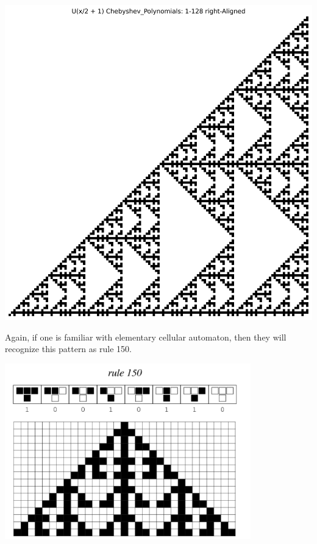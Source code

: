 \documentclass{article}
\begin{document}
	\begin{center}
		\includegraphics[width=.8\textwidth]{../../code/serialization/chebyshev/chebyshev2_right_128.png}	
	\end{center}

	Again, if one is familiar with elementary cellular automaton, then they will recognize this pattern as rule 150.
	
	\begin{center}
		\includegraphics[width=0.8\textwidth]{rule150.png}
	\end{center}
\end{document}
